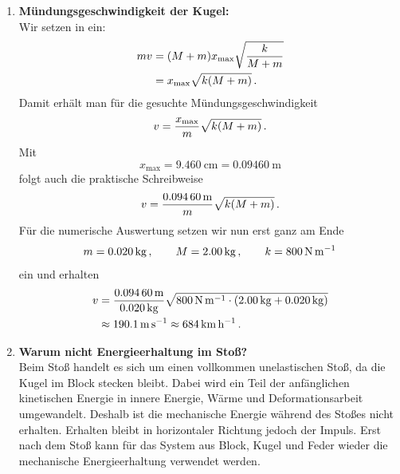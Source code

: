 \documentclass[ngerman]{scrreprt}
\newenvironment{loesungbox}[1]
  {\needspace{5\baselineskip}\begin{loesungboxstyle}[frametitle={#1}]}
  {\end{loesungboxstyle}}
\begin{document}
\begin{loesungbox}{Lösung zu \Cref{aufg:kugel_block_muendung}}
\begin{enumerate}
        \item \textbf{Mündungsgeschwindigkeit der Kugel:} \\
        Wir setzen  in  ein:
        \begin{align}
            m v &= (M+m) x_{\text{max}}\sqrt{\frac{k}{M+m}} \\
            &= x_{\text{max}}\sqrt{k(M+m)} \,.
        \end{align}
        Damit erhält man für die gesuchte Mündungsgeschwindigkeit
        \begin{equation}\label{eq: kugel_block_muendung_v}
            v = \frac{x_{\text{max}}}{m}\sqrt{k(M+m)} \,.
        \end{equation}
        Mit
        \begin{equation}
            x_{\text{max}} = \SI{9.460}{\centi\meter} = \SI{0.09460}{\meter}
        \end{equation}
        folgt auch die praktische Schreibweise
        \begin{equation}
            v = \frac{\SI{0.09460}{\meter}}{m}\sqrt{k(M+m)} \,.
        \end{equation}
        Für die numerische Auswertung setzen wir nun erst ganz am Ende
        \begin{equation*}
            m = \SI{0.020}{\kilo\gram} \,{,}\, \qquad M = \SI{2.00}{\kilo\gram} \,{,}\, \qquad k = \SI{800}{\newton\per\meter}
        \end{equation*}
        ein und erhalten
        \begin{align}
            v &= \frac{\SI{0.09460}{\meter}}{\SI{0.020}{\kilo\gram}}\sqrt{\SI{800}{\newton\per\meter}\cdot\left(\SI{2.00}{\kilo\gram}+\SI{0.020}{\kilo\gram}\right)} \\
            &\approx \SI{190.1}{\meter\per\second} \approx \SI{684}{\kilo\meter\per\hour} \,.
        \end{align}

        \item \textbf{Warum nicht Energieerhaltung im Stoß?} \\
        Beim Stoß handelt es sich um einen vollkommen unelastischen Stoß, da die Kugel im Block stecken bleibt. Dabei wird ein Teil der anfänglichen kinetischen Energie in innere Energie, Wärme und Deformationsarbeit umgewandelt. Deshalb ist die mechanische Energie während des Stoßes nicht erhalten. Erhalten bleibt in horizontaler Richtung jedoch der Impuls. Erst nach dem Stoß kann für das System aus Block, Kugel und Feder wieder die mechanische Energieerhaltung verwendet werden.
    \end{enumerate}
    \end{loesungbox}
\end{document}
